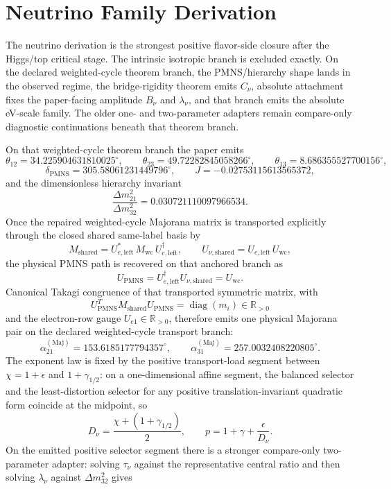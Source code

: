 \documentclass[11pt]{article}
\begin{document}
\section{Neutrino Family Derivation}

The neutrino derivation is the strongest positive flavor-side closure after the Higgs/top
critical stage. The intrinsic isotropic branch is excluded exactly. On the declared
weighted-cycle theorem branch, the PMNS/hierarchy shape lands in the observed regime, the
bridge-rigidity theorem emits \(C_\nu\), absolute attachment fixes the paper-facing amplitude
\(B_\nu\) and \(\lambda_\nu\), and that branch emits the absolute eV-scale family. The older one- and two-parameter adapters
remain compare-only diagnostic continuations beneath that theorem branch.

On that weighted-cycle theorem branch the paper emits
\[
\theta_{12}=34.225904631810025^\circ,\qquad
\theta_{23}=49.72282845058266^\circ,\qquad
\theta_{13}=8.686355527700156^\circ,
\]
\[
\delta_{\mathrm{PMNS}}=305.58061231449796^\circ,\qquad
J=-0.02753115613565372,
\]
and the dimensionless hierarchy invariant
\[
\frac{\Delta m_{21}^2}{\Delta m_{32}^2}=0.030721110097966534.
\]
Once the repaired weighted-cycle Majorana matrix is transported explicitly through the closed shared same-label basis by
\[
M_{\mathrm{shared}}=U_{e,\mathrm{left}}^*\,M_{\mathrm{wc}}\,U_{e,\mathrm{left}}^\dagger,
\qquad
U_{\nu,\mathrm{shared}}=U_{e,\mathrm{left}}\,U_{\mathrm{wc}},
\]
the physical PMNS path is recovered on that anchored branch as
\[
U_{\mathrm{PMNS}}=U_{e,\mathrm{left}}^\dagger U_{\nu,\mathrm{shared}}=U_{\mathrm{wc}}.
\]
Canonical Takagi congruence of that transported symmetric matrix, with
\[
U_{\mathrm{PMNS}}^T M_{\mathrm{shared}} U_{\mathrm{PMNS}}=\operatorname{diag}(m_i)\in\mathbb R_{>0}
\]
and the electron-row gauge \(U_{e1}\in\mathbb R_{>0}\), therefore emits one physical Majorana pair on the declared weighted-cycle transport branch:
\[
\alpha_{21}^{(\mathrm{Maj})}=153.6185177794357^\circ,
\qquad
\alpha_{31}^{(\mathrm{Maj})}=257.0032408220805^\circ.
\]
The exponent law is fixed by the positive transport-load segment between
\(\chi=1+\epsilon\) and \(1+\gamma_{1/2}\): on a one-dimensional affine segment,
the balanced selector and the least-distortion selector for any positive
translation-invariant quadratic form coincide at the midpoint, so
\[
D_\nu=\frac{\chi+(1+\gamma_{1/2})}{2},
\qquad
p=1+\gamma+\frac{\epsilon}{D_\nu}.
\]
On the emitted positive selector segment there is a stronger compare-only two-parameter adapter: solving \(\tau_\nu\) against the representative central ratio and then solving \(\lambda_\nu\) against \(\Delta m_{32}^2\) gives
\end{document}
